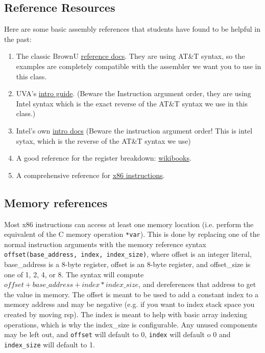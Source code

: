\documentclass[11pt]{article}
\begin{document}
\subsection{Reference Resources}

Here are some basic assembly references that students have found to be helpful in the
past:

\begin{enumerate}
    \item The classic BrownU
        \href{https://cs.brown.edu/courses/cs033/docs/guides/x64_cheatsheet.pdf}{reference
        docs}. They are using AT\&T syntax, so the examples are completely compatible with
        the assembler we want you to use in this class.
    \item UVA's \href{https://www.cs.virginia.edu/~evans/cs216/guides/x86.html}{intro
        guide}. (Beware the Instruction argument order, they are using Intel syntax which
        is the exact reverse of the AT\&T syntax we use in this class.)
    \item Intel's own
        \href{https://www.intel.com/content/dam/develop/external/us/en/documents/introduction-to-x64-assembly-181178.pdf}{intro docs}
        (Beware the instruction argument order! This is intel sytax, which is the reverse
        of the AT\&T syntax we use)
    \item A good reference for the register breakdown:
        \href{https://en.wikibooks.org/wiki/X86_Assembly/X86_Architecture}{wikibooks}.
    \item A comprehensive reference for
        \href{https://www.felixcloutier.com/x86/}{x86 instructions}.
\end{enumerate}

\subsection{Memory references}

Most x86 instructions can access at least one memory location (i.e. perform the equivalent
of the C memory operation \texttt{*var}). This is done by replacing one of the normal
instruction arguments with the memory reference syntax \texttt{offset(base\_address,
index, index\_size)}, where offset is an integer literal, base\_address is a 8-byte
register, offset is an 8-byte register, and offset\_size is one of 1, 2, 4, or 8. The
syntax will compute $offset + base\_address + index * index\_size$, and dereferences that
address to get the value in memory. The offset is meant to be used to add a constant index
to a memory address and may be negative (e.g. if you want to index stack space you created
by moving rsp). The index is meant to help with basic array indexing operations, which is
why the index\_size is configurable. Any unused components may be left out, and
\texttt{offset} will default to 0, \texttt{index} will default o 0 and \texttt{index\_size}
will default to 1.
\end{document}
